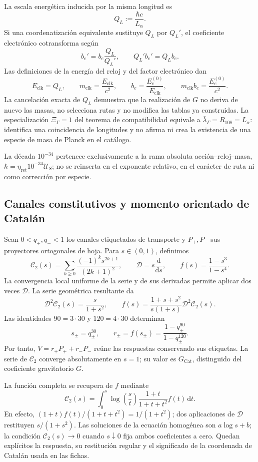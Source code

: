 La escala energ\'etica inducida por la misma longitud es
\[
 Q_L:=\frac{\hbar c}{L_{\alpha}}.
 \tag{A.4}\label{eq:vi-cat-escala-q}
\]
Si una coordenatización equivalente sustituye \(Q_L\) por \(Q_L'\), el coeficiente
electr\'onico cotransforma seg\'un
\[
 b_e'=b_e\frac{Q_L}{Q_L'},\qquad Q_L'b_e'=Q_Lb_e .
 \tag{A.5}\label{eq:vi-cat-cotransformacion-be}
\]
Las definiciones de la energ\'ia del reloj y del factor electr\'onico dan
\[
 E_{\mathrm{clk}}=Q_L,\qquad
 m_{\mathrm{clk}}=\frac{E_{\mathrm{clk}}}{c^2},\qquad
 b_e=\frac{E_e^{(0)}}{E_{\mathrm{clk}}},\qquad
 m_{\mathrm{clk}}b_e=\frac{E_e^{(0)}}{c^2}.
\]
La cancelaci\'on exacta de \(Q_L\) demuestra que la realizaci\'on de \(G\) no
deriva de nuevo las masas, no selecciona rutas y no modifica las tablas ya
construidas. La especializaci\'on \(\Xi_\Gamma=1\) del teorema de
compatibilidad equivale a
\(\bar\lambda_\Gamma=R_{108}=L_{\alpha}\): identifica una coincidencia de
longitudes y no afirma ni crea la existencia de una especie de masa de Planck
en el cat\'alogo.

La d\'ecada \(10^{-34}\) pertenece exclusivamente a la rama absoluta
acci\'on--reloj--masa,
\(\hbar=\eta_{\mathrm{ret}}10^{-34}\mathcal U_S\); no se reinserta en el
exponente relativo, en el car\'acter de ruta ni como correcci\'on por especie.

\subsection{Canales constitutivos y momento orientado de Catal\'an}
\label{sec:vi-catalogo-propietario-constitutivo}

Sean \(0<q_+,q_-<1\) los canales etiquetados de transporte y \(P_+,P_-\)
sus proyectores ortogonales de hoja. Para \(s\in(0,1)\), definimos
\[
 \mathcal C_2(s)=\sum_{k\geq0}
 \frac{(-1)^k s^{2k+1}}{(2k+1)^2},\qquad
 \mathcal D=s\frac{\mathrm d}{\mathrm ds},\qquad
 f(s)=\frac{1-s^3}{1-s^4}.
 \tag{A.6}\label{eq:vi-cat-constitutivas}
\]
La convergencia local uniforme de la serie y de sus derivadas permite aplicar
dos veces \(\mathcal D\). La serie geom\'etrica resultante da
\[
 \mathcal D^2\mathcal C_2(s)=\frac{s}{1+s^2},\qquad
 f(s)=\frac{1+s+s^2}{s(1+s)}\mathcal D^2\mathcal C_2(s).
\]
Las identidades \(90=3\cdot30\) y \(120=4\cdot30\) determinan
\[
 s_{\pm}=q_{\pm}^{30},\qquad
 r_{\pm}=f(s_{\pm})
 =\frac{1-q_{\pm}^{90}}{1-q_{\pm}^{120}}.
\]
Por tanto, \(V=r_+P_++r_-P_-\) re\'une las respuestas conservando sus
etiquetas. La serie de \(\mathcal C_2\) converge absolutamente en \(s=1\);
su valor es \(G_{\mathrm{Cat}}\), distinguido del coeficiente gravitatorio
\(G\).

La funci\'on completa se recupera de \(f\) mediante
\[
 \mathcal C_2(s)=\int_0^s\log\!\left(\frac{s}{t}\right)
 \frac{1+t}{1+t+t^2}f(t)\,\mathrm dt.
\]
En efecto, \((1+t)f(t)/(1+t+t^2)=1/(1+t^2)\); dos aplicaciones de
\(\mathcal D\) restituyen \(s/(1+s^2)\). Las soluciones de la ecuaci\'on
homog\'enea son \(a\log s+b\); la condici\'on
\(\mathcal C_2(s)\to0\) cuando \(s\downarrow0\) fija ambos coeficientes a
cero. Quedan expl\'icitos la respuesta, su restituci\'on regular y el
significado de la coordenada de Catal\'an usada en las fichas.
